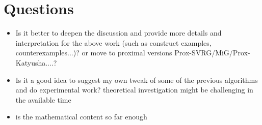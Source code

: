 \documentclass[12pt]{report}
\newcounter{theo}[section]
\begin{document}
\chapter{Questions}
\begin{itemize}
    \item Is it better to deepen the discussion and provide more details and interpretation for the above work (such as construct examples, counterexamples...)?  or move to proximal versions Prox-SVRG/MiG/Prox-Katyusha....?
    \item Is it a good idea to suggest my own tweak of some of the previous algorithms and do experimental work? theoretical investigation might be challenging in the available time
    \item is the mathematical content so far enough
\end{itemize}



{}

\end{document}

